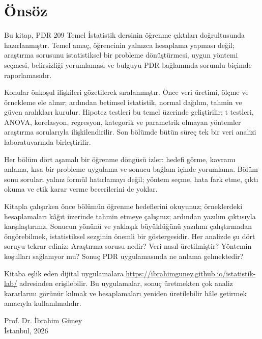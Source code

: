 \chapter*{Önsöz}

Bu kitap, PDR 209 Temel İstatistik dersinin öğrenme çıktıları doğrultusunda
hazırlanmıştır. Temel amaç, öğrencinin yalnızca hesaplama yapması değil;
araştırma sorusunu istatistiksel bir probleme dönüştürmesi, uygun yöntemi
seçmesi, belirsizliği yorumlaması ve bulguyu PDR bağlamında sorumlu biçimde
raporlamasıdır.

Konular önkoşul ilişkileri gözetilerek sıralanmıştır. Önce veri üretimi,
ölçme ve örnekleme ele alınır; ardından betimsel istatistik, normal dağılım,
tahmin ve güven aralıkları kurulur. Hipotez testleri bu temel üzerinde
geliştirilir; t testleri, ANOVA, korelasyon, regresyon, kategorik ve
parametrik olmayan yöntemler araştırma sorularıyla ilişkilendirilir. Son
bölümde bütün süreç tek bir veri analizi laboratuvarında birleştirilir.

Her bölüm dört aşamalı bir öğrenme döngüsü izler: hedefi görme, kavramı
anlama, kısa bir probleme uygulama ve sonucu bağlam içinde yorumlama. Bölüm
sonu soruları yalnız formül hatırlamayı değil; yöntem seçme, hata fark etme,
çıktı okuma ve etik karar verme becerilerini de yoklar.

Kitapla çalışırken önce bölümün öğrenme hedeflerini okuyunuz; örneklerdeki
hesaplamaları kâğıt üzerinde tahmin etmeye çalışınız; ardından yazılım
çıktısıyla karşılaştırınız. Sonucun yönünü ve yaklaşık büyüklüğünü yazılımı
çalıştırmadan öngörebilmek, istatistiksel sezginin önemli bir göstergesidir.
Her analizde şu dört soruyu tekrar ediniz: Araştırma sorusu nedir? Veri nasıl
üretilmiştir? Yöntemin koşulları sağlanıyor mu? Sonuç PDR uygulamasında ne
anlama gelmektedir?

Kitaba eşlik eden dijital uygulamalara
\url{https://ibrahimguney.github.io/istatistik-lab/} adresinden erişilebilir.
Bu uygulamalar, sonuç üretmekten çok analiz kararlarını görünür kılmak ve
hesaplamaları yeniden üretilebilir hâle getirmek amacıyla kullanılmalıdır.

\begin{flushright}
Prof. Dr. İbrahim Güney\\
İstanbul, 2026
\end{flushright}
